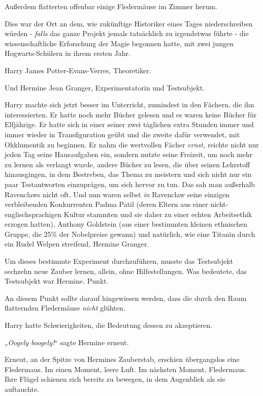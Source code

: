 {Außerdem flatterten offenbar einige Fledermäuse im Zimmer herum.

Dies war der Ort an dem, wie zukünftige Historiker eines Tages niederschreiben würden - \emph{falls} das ganze Projekt jemals tatsächlich zu irgendetwas führte - die wissenschaftliche Erforschung der Magie begonnen hatte, mit zwei jungen Hogwarts-Schülern in ihrem ersten Jahr.

Harry James Potter-Evans-Verres, Theoretiker.

Und Hermine Jean Granger, Experimentatorin und Testsubjekt.

Harry machte sich jetzt besser im Unterricht, zumindest in den Fächern, die ihn interessierten. Er hatte noch mehr Bücher gelesen und es waren keine Bücher für Elfjährige. Er hatte sich in einer seiner zwei täglichen extra Stunden immer und immer wieder in Transfiguration geübt und die zweite dafür verwendet, mit Okklumentik zu beginnen. Er nahm die wertvollen Fächer \emph{ernst,} reichte nicht nur jeden Tag seine Hausaufgaben ein, sondern nutzte seine Freizeit, um noch mehr zu lernen als verlangt wurde, andere Bücher zu lesen, die über seinen Lehrstoff hinausgingen, in dem Bestreben, das Thema zu meistern und sich nicht nur ein paar Testantworten einzuprägen, um sich hervor zu tun. Das sah man außerhalb Ravenclaws nicht oft. Und nun waren selbst \emph{in} Ravenclaw seine einzigen verbleibenden Konkurrenten Padma Patil (deren Eltern aus einer nicht-englischsprachigen Kultur stammten und sie daher zu einer echten Arbeitsethik erzogen hatten), Anthony Goldstein (aus einer bestimmten kleinen ethnischen Gruppe, die 25\% der Nobelpreise gewann) und natürlich, wie eine Titanin durch ein Rudel Welpen streifend, Hermine Granger.

Um dieses bestimmte Experiment durchzuführen, musste das Testsubjekt sechzehn neue Zauber lernen, allein, ohne Hilfestellungen. Was bedeutete, das Testsubjekt war Hermine. Punkt.

An diesem Punkt sollte darauf hingewiesen werden, dass die durch den Raum flatternden Fledermäuse \emph{nicht} glühten.

Harry hatte Schwierigkeiten, die Bedeutung dessen zu akzeptieren.

„\emph{Oogely boogely!}“ sagte Hermine erneut.

Erneut, an der Spitze von Hermines Zauberstab, erschien übergangslos eine Fledermaus. Im einen Moment, leere Luft. Im nächsten Moment, Fledermaus. Ihre Flügel schienen sich bereits zu bewegen, in dem Augenblick als sie auftauchte.

}
